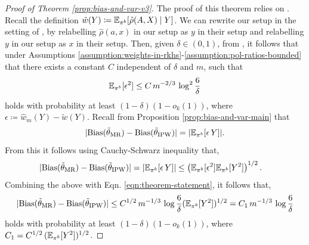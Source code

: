 \begin{proof}[Proof of Theorem \ref{prop:bias-and-var-v3}]
The proof of this theorem relies on \cite[Theorem 4.1]{lai2023generalization}. 
Recall the definition $\tilde{w}(Y)\coloneqq \mathbb{E}_{\pi^b}[\hat{\rho}(A, X) \mid Y]$. 
We can rewrite our setup in the setting of \cite[Theorem 4.1]{lai2023generalization}, by relabelling $\hat{\rho}(a, x)$ in our setup as $y$ in their setup and relabelling $y$ in our setup as $x$ in their setup. 
Then, given $\delta \in (0, 1)$, from \cite[Theorem 4.1]{lai2023generalization}, it follows that under Assumptions \ref{assumption:weights-in-rkhs}-\ref{assumption:pol-ratios-bounded} that there exists a constant $C$ independent of $\delta$ and $m$, such that
    \begin{align}
        \mathbb{E}_{\pi^b}[\epsilon^2] \leq C\, m^{-2/3} \, \log^2{\frac{6}{\delta}} \label{eqn:theorem-statement}
    \end{align}
    holds with probability at least $(1-\delta)(1-o_{k}(1))$, where $\epsilon \coloneqq \hat{w}_m(Y) - \tilde{w}(Y)$. Recall from Proposition \ref{prop:bias-and-var-main} that
    \[|\textup{Bias}(\tilde{\theta}_{\textup{MR}}) - \textup{Bias}(\tilde{\theta}_{\textup{IPW}})|  = |\mathbb{E}_{\pi^b}[\epsilon\,Y] |. \]
    From this it follows using Cauchy-Schwarz inequality that,
    \begin{align*}
        |\textup{Bias}(\tilde{\theta}_{\textup{MR}}) - \textup{Bias}(\tilde{\theta}_{\textup{IPW}})| &=|\mathbb{E}_{\pi^b}[\epsilon\,Y] | \leq \left(\mathbb{E}_{\pi^b}[\epsilon^2] \mathbb{E}_{\pi^b}[Y^2]\right)^{1/2}.
    \end{align*}
    Combining the above with Eqn. \eqref{eqn:theorem-statement}, it follows that,
    \begin{align*}
        |\textup{Bias}(\tilde{\theta}_{\textup{MR}}) - \textup{Bias}(\tilde{\theta}_{\textup{IPW}})| \leq C^{1/2}\, m^{-1/3}\, \log{\frac{6}{\delta}} (\mathbb{E}_{\pi^b}[Y^2])^{1/2} = C_1 \, m^{-1/3}\, \log{\frac{6}{\delta}}
    \end{align*}
    holds with probability at least $(1-\delta)(1-o_{k}(1))$, where $C_1 = C^{1/2}\, (\mathbb{E}_{\pi^b}[Y^2])^{1/2}$. 


\end{proof}
